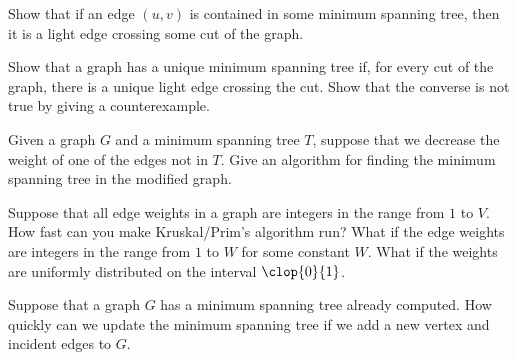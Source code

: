 \begin{exercise}
    \item Show that if an edge \((u,v)\) is contained in some minimum spanning tree, then it is a light edge crossing some cut of the graph.
    \item Show that a graph has a unique minimum spanning tree if, for every cut of the graph, there is a unique light edge crossing the cut. Show that the converse is not true by giving a counterexample.
    \item Given a graph \(G\) and a minimum spanning tree \(T\), suppose that we decrease the weight of one of the edges not in \(T\). Give an algorithm for finding the minimum spanning tree in the modified graph.
    \item Suppose that all edge weights in a graph are integers in the range from \(1\) to \(V\). How fast can you make Kruskal/Prim's algorithm run? What if the edge weights are integers in the range from \(1\) to \(W\) for some constant \(W\). What if the weights are uniformly distributed on the interval \(\clop{0}{1}\).
    \item Suppose that a graph \(G\) has a minimum spanning tree already computed. How quickly can we update the minimum spanning tree if we add a new vertex and incident edges to \(G\).
    \item 
\end{exercise}
